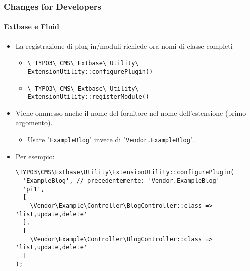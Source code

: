 
\begin{frame}[fragile]
	\frametitle{Changes for Developers}
	\framesubtitle{Extbase e Fluid}

	\lstset{basicstyle=\tiny\ttfamily}

	\begin{itemize}
		\item La registrazione di plug-in/moduli richiede ora nomi di classe completi

			\begin{itemize}\smaller
				\item \texttt{\textbackslash
					TYPO3\textbackslash
					CMS\textbackslash
					Extbase\textbackslash
					Utility\textbackslash
					ExtensionUtility::configurePlugin()}
				\item \texttt{\textbackslash
					TYPO3\textbackslash
					CMS\textbackslash
					Extbase\textbackslash
					Utility\textbackslash
					ExtensionUtility::registerModule()}
			\end{itemize}\normalsize

		\item Viene ommesso anche il nome del fornitore nel nome dell'estensione (primo argomento).

			\begin{itemize}\smaller
				\item[\ding{228}] Usare "\texttt{ExampleBlog}" invece di "\texttt{Vendor.ExampleBlog}".
			\end{itemize}

		\item Per esempio:

\begin{lstlisting}
\TYPO3\CMS\Extbase\Utility\ExtensionUtility::configurePlugin(
  'ExampleBlog', // precedentemente: 'Vendor.ExampleBlog'
  'pi1',
  [
    \Vendor\Example\Controller\BlogController::class => 'list,update,delete'
  ],
  [
    \Vendor\Example\Controller\BlogController::class => 'list,update,delete'
  ]
);
\end{lstlisting}

	\end{itemize}

\end{frame}


